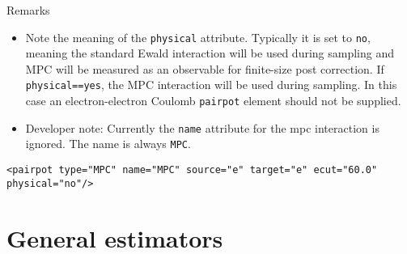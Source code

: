 \FloatBarrier
Remarks
\begin{itemize}
  \item{Note the meaning of the \texttt{physical} attribute.  Typically it is set to \texttt{no}, meaning the standard Ewald interaction will be used during sampling and MPC will be measured as an observable for finite-size post correction.  If \texttt{physical==yes}, the MPC interaction will be used during sampling.  In this case an electron-electron Coulomb \texttt{pairpot} element should not be supplied.}
  \item{Developer note: Currently the \texttt{name} attribute for the mpc interaction is ignored.  The name is always \texttt{MPC}.}
\end{itemize}

\begin{lstlisting}[caption=Modified periodic coulomb for finite size post-correction.]
  <pairpot type="MPC" name="MPC" source="e" target="e" ecut="60.0" physical="no"/>
\end{lstlisting}



\section{General estimators}

